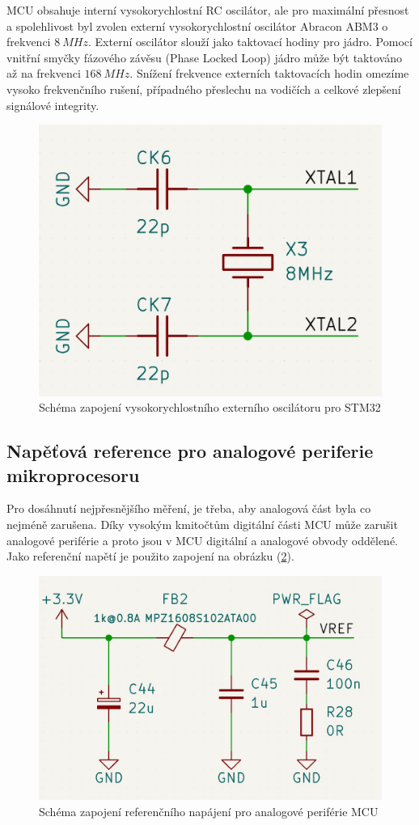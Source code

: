 MCU obsahuje interní vysokorychlostní RC oscilátor, ale pro maximální přesnost a spolehlivost byl zvolen externí vysokorychlostní oscilátor Abracon ABM3 o frekvenci  $8 \ MHz$. Externí oscilátor slouží jako taktovací hodiny pro
jádro.
Pomocí vnitřní smyčky fázového závěsu (Phase Locked Loop) jádro může být taktováno až na frekvenci $168 \ MHz$.
Snížení frekvence externích taktovacích hodin omezíme vysoko frekvenčního rušení, případného přeslechu na vodičích a celkové zlepšení signálové integrity.
\begin{figure}[H]
    \centering
    \includegraphics[width=0.8\linewidth]{pictures/stm32_hse.jpg}
    \caption{Schéma zapojení vysokorychlostního externího oscilátoru pro STM32}
    \label{fig:stm32_hse}
\end{figure}


\pagebreak
\subsection{Napěťová reference pro analogové periferie mikroprocesoru} \label{section:vref}
Pro dosáhnutí nejpřesnějšího měření, je třeba, aby analogová část byla co nejméně zarušena. Díky vysokým kmitočtům digitální části MCU může zarušit analogové periférie a proto jsou v MCU digitální a analogové obvody oddělené.
Jako referenční napětí je použito zapojení na obrázku (\ref{fig:stm32_vref}).

\begin{figure}[H]
    \centering
    \includegraphics[width=0.9\linewidth]{pictures/stm_analog_reference.jpg}
    \caption{Schéma zapojení referenčního napájení pro analogové periférie MCU}
    \label{fig:stm32_vref}
\end{figure}

